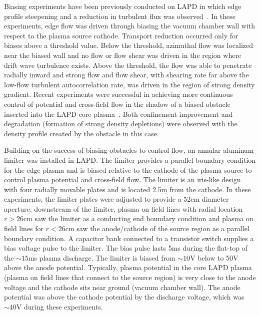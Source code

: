 \documentclass[aps,prl,amsmath,amssymb,preprint,superscriptaddress]{revtex4}
\begin{document}
Biasing experiments have been previously conducted on LAPD in which
edge profile steepening and a reduction in turbulent flux was
observed~\cite{maggs07,carter09}. In these experiments, edge flow was
driven through biasing the vacuum chamber wall with respect to the
plasma source cathode.  Transport reduction occurred only for biases
above a threshold value.  Below the threshold, azimuthal flow was
localized near the biased wall and no flow or flow shear was driven in
the region where drift wave turbulence exists.  Above the threshold,
the flow was able to penetrate radially inward and strong flow and
flow shear, with shearing rate far above the low-flow turbulent
autocorrelation rate, was driven in the region of strong density
gradient.   Recent experiments were successful in achieving more continuous control of potential and cross-field flow in the shadow of a biased obstacle inserted into the LAPD core plasma~\cite{zhou12}.  Both confinement improvement and degradation (formation of strong density depletions) were observed with the density profile created by the obstacle in this case.  

Building on the success of biasing obstacles to control flow, an
annular aluminum limiter was installed in LAPD. The limiter provides a parallel boundary condition for the edge plasma and is biased relative to the cathode of the plasma source to control plasma potential and cross-field flow.  The limiter is
an iris-like design with four radially movable plates and is located 2.5m from
the cathode.  In these experiments, the limiter plates were adjusted
to provide a 52cm diameter aperture; downstream of the
limiter, plasma on field lines with radial location $r>26$cm saw the
limiter as a conducting end boundary condition and plasma on field
lines for $r<26$cm saw the anode/cathode of the source region as a
parallel boundary condition.  A capacitor bank connected to a transistor switch supplies a bias voltage pulse to the limiter.  The
bias pulse lasts 5ms during the flat-top of the $\sim 15$ms plasma
discharge. The limiter is biased from $\sim 10$V below to 50V above the anode potential.  Typically, plasma potential
in the core LAPD plasma (plasma on field lines that connect to the
source region) is very close to the anode voltage and the cathode sits
near ground (vacuum chamber wall).  The anode potential was above the
cathode potential by the discharge voltage, which was $\sim 40$V during these experiments.
\end{document}
